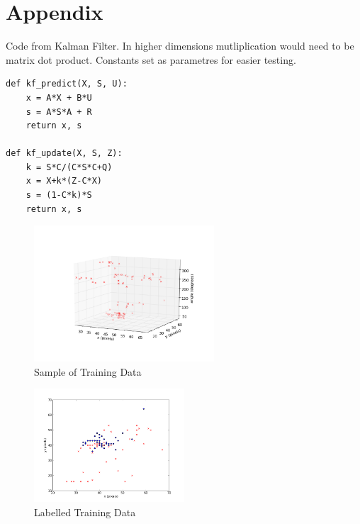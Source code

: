 \section{Appendix}

Code from Kalman Filter. In higher dimensions mutliplication would need to be matrix dot product. Constants set as parametres for easier testing.
\begin{verbatim}
def kf_predict(X, S, U):
	x = A*X + B*U
	s = A*S*A + R
	return x, s

def kf_update(X, S, Z):
	k = S*C/(C*S*C+Q)
	x = X+k*(Z-C*X)
	s = (1-C*k)*S
	return x, s
\end{verbatim}


\begin{figure}[tbd]
\includegraphics[width=0.6\textwidth]{images/training_data.png}
\caption{\label{occupied} Sample of Training Data}
\end{figure}


\begin{figure}[tbd]
\includegraphics[width=0.5\textwidth]{images/xy_training_coloured.png}
\caption{\label{occupied} Labelled Training Data}
\end{figure}